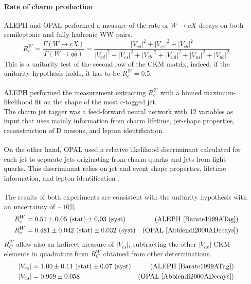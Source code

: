 \paragraph*{Rate of charm production}
ALEPH and OPAL performed a measure of the rate or $W\to cX$ decays on both semileptonic and fully hadronic WW pairs.
\begin{equation}
    R_c^W=\frac{\Gamma(W\to cX)}{\Gamma(W\to q\bar{q})}=\frac{|V_{cd}|^2+|V_{cs}|^2+|V_{cb}|^2}{|V_{cd}|^2+|V_{cs}|^2+|V_{cb}|^2+|V_{ud}|^2+|V_{us}|^2+|V_{ub}|^2}
\end{equation}
This is a unitarity test of the second row of the CKM matrix, indeed, if the unitarity hypothesis holds, it has to be $R_c^W=0.5$.
\\
\\
ALEPH performed the measurement extracting $R_c^W$ with a binned maximum-likelihood fit on the shape of the most c-tagged jet\cite{Barate1999ATag}.\\
The charm jet tagger was a feed-forward neural network with 12 variables as input that uses mainly information from charm lifetime, jet-shape properties, reconstruction of D mesons, and lepton identification.\\
\\
On the other hand, OPAL used a relative likelihood discriminant calculated for each jet to separate jets originating from charm quarks and jets from light quarks. This discriminant relies on jet and event shape properties, lifetime information, and lepton identification \cite{Abbiendi2000ADecays}.
\\
\\
The results of both experiments are consistent with the unitarity hypothesis with an uncertainty of $\sim 10\%$
\begin{equation}
\begin{aligned}
    R_c^W&=0.51 \pm 0.05 \text{ (stat)} \pm 0.03 \text{ (syst)} & \text{(ALEPH \cite{Barate1999ATag})}\\
    R_c^W&=0.481 \pm 0.042 \text{ (stat)} \pm 0.032 \text{ (syst)} & \text{(OPAL \cite{Abbiendi2000ADecays})}
\end{aligned}
\end{equation}\vspace{-0.001cm}
$R_C^W$ allow also an indirect measure of $|V_{cs}|$, subtracting the other $|V_{cx}|$ CKM elements in quadrature from $R_C^W$ obtained from other determinations.
\begin{equation}
\begin{aligned}
    |V_{cs}|&=1.00\pm0.11  \text{ (stat)} \pm 0.07 \text{ (syst)} & \text{(ALEPH \cite{Barate1999ATag})}\\
    |V_{cs}|&=0.969\pm0.058 & \text{(OPAL \cite{Abbiendi2000ADecays})}
\end{aligned}
\end{equation}
